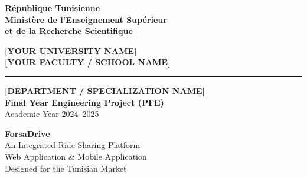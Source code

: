 \documentclass[12pt,a4paper,openright]{report}
\begin{document}
\onehalfspacing

\begin{titlepage}
\begin{center}

\begin{minipage}{0.45\textwidth}
\centering
\textbf{\small République Tunisienne}\\
\textbf{\small Ministère de l'Enseignement Supérieur}\\
\textbf{\small et de la Recherche Scientifique}
\end{minipage}
\hfill
\begin{minipage}{0.45\textwidth}
\centering
\textbf{\small [YOUR UNIVERSITY NAME]}\\
\textbf{\small [YOUR FACULTY / SCHOOL NAME]}
\end{minipage}

\vspace{0.5cm}
\noindent\rule{\textwidth}{1.5pt}
\vspace{0.3cm}

{\large \textbf{[DEPARTMENT / SPECIALIZATION NAME]}}\\[0.3cm]
{\large \textbf{Final Year Engineering Project (PFE)}}\\[0.2cm]
{\normalsize Academic Year 2024–2025}

\vspace{0.8cm}

\begin{tcolorbox}[colback=fdnavy, colframe=fdnavy, boxrule=0pt,
    left=1cm, right=1cm, top=0.6cm, bottom=0.6cm]
\centering
{\Huge\bfseries\color{white} ForsaDrive}\\[0.4cm]
{\Large\color{fdaccent} An Integrated Ride-Sharing Platform}\\[0.2cm]
{\large\color{white!80!gray} Web Application \& Mobile Application}\\[0.2cm]
{\normalsize\color{white!70!gray} Designed for the Tunisian Market}
\end{tcolorbox}

\vspace{0.8cm}


\end{center}
\end{titlepage}
\end{document}
